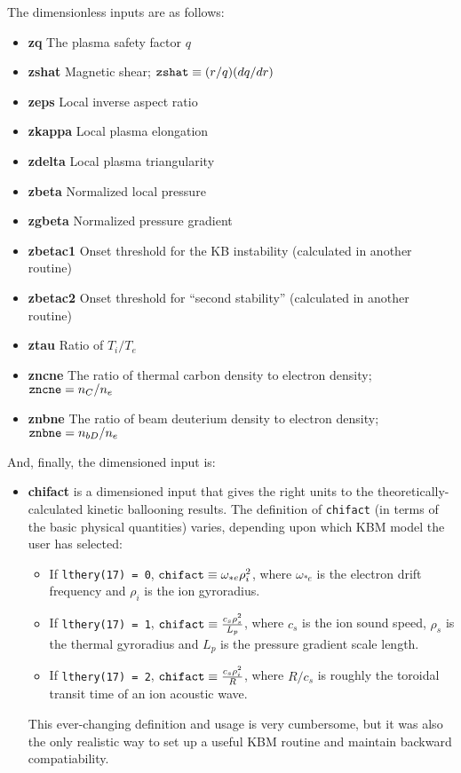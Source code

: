 The dimensionless inputs are as follows:

\begin{itemize}
\itemsep 0pt
\item {\bf zq} The plasma safety factor $q$
\item {\bf zshat} Magnetic shear; ${\tt zshat} \equiv (r/q) (dq/dr)$
\item {\bf zeps} Local inverse aspect ratio
\item {\bf zkappa} Local plasma elongation
\item {\bf zdelta} Local plasma triangularity
\item {\bf zbeta} Normalized local pressure
\item {\bf zgbeta} Normalized pressure gradient
\item {\bf zbetac1} Onset threshold for the KB instability
(calculated in another routine)
\item {\bf zbetac2} Onset threshold for ``second stability''
(calculated in another routine)
\item {\bf ztau} Ratio of $T_i/T_e$
\item {\bf zncne} The ratio of thermal carbon density to electron density;
${\tt zncne} = n_C/n_e$
\item {\bf znbne} The ratio of beam deuterium density to electron density;
${\tt znbne} = n_{bD}/n_e$
\end{itemize}

And, finally, the dimensioned input is:
\begin{itemize}
\itemsep 0pt
\item {\bf chifact} is a dimensioned input that gives the right units to
the theoretically-calculated kinetic ballooning results.
The definition of {\tt chifact} (in terms of the basic physical quantities)
varies, depending upon which KBM model the user has selected:
\begin{itemize}
\itemsep 0pt
\item If {\tt lthery(17) = 0}, ${\tt chifact} \equiv \omega_{*e} \rho_i^2$,
where $\omega_{*e}$ is the electron drift frequency and
$\rho_i$ is the ion gyroradius.
\item If {\tt lthery(17) = 1}, ${\tt chifact} \equiv \frac{c_s \rho_s^2}{L_p}$,
where $c_s$ is the ion sound speed,
$\rho_s$ is the thermal gyroradius and
$L_p$ is the pressure gradient scale length.
\item If {\tt lthery(17) = 2}, ${\tt chifact} \equiv \frac{c_s \rho_i^2}{R}$,
where $R/c_s$ is roughly the toroidal transit time of an ion acoustic wave.
\end{itemize}
This ever-changing definition and usage is very cumbersome, but it was also
the only realistic way to set up a useful KBM routine and
maintain backward compatiability.
\end{itemize}

